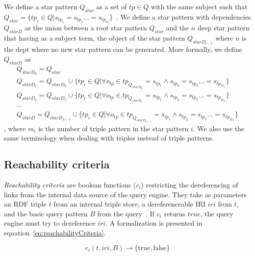 \begin{definition}\label{def:starPattern}
    We define a star pattern $Q_{star}$ as a set of $tp \in Q$ with the same subject such that $Q_{star} = \{ tp_i \in Q| s_{tp_1} = s_{tp_2} ... = s_{tp_m}\}$~\cite{Karim2020}.
    We define a star pattern with dependencies $Q_{starD}$ as the union between a root star pattern $Q_{star}$ and the $n$ deep star pattern
    that having as a subject term, the object of the star pattern $Q_{starD_{i-1}}$ where $n$ is the dept where no new star pattern can be generated.
    More formally, we define $Q_{starD}$ as
    \begin{multline}\label{eq:starPattern1D}
     Q_{starD_0} = Q_{star} \\
     Q_{starD_1} = Q_{starD_0} \cup \{tp_i \in Q| \forall o_{tp} \in tp_{ Q_{starD_0}} = s_{tp_1} \land s_{tp_2} = s_{tp_3} ... = s_{tp_{m_1}}\} \\
     Q_{starD_2} = Q_{starD_1} \cup \{tp_i \in Q| \forall o_{tp} \in tp_{ Q_{starD_1}} = s_{tp_1} \land s_{tp_2} = s_{tp_3} ... = s_{tp_{m_2}}\} \\
     \dotsm \\
     Q_{starD} = Q_{starD_{n-1}} \cup \{tp_i \in Q| \forall o_{tp} \in tp_{ Q_{starD_{n-1}}} = s_{tp_1} \land s_{tp_2} = s_{tp_3} ... = s_{tp_{m_n}}\}
    \end{multline},
    where $m_i$ is the number of triple pattern in the star pattern $i$.
    We also use the same terminology when dealing with triples instead of triple patterns.
\end{definition}

\subsection{Reachability criteria}

\emph{Reachability criteria} are boolean functions ($c_i$) restricting the dereferencing of links from the internal data source of the query engine.
They take as parameters an RDF triple $t$ from an internal triple store, a dereferenceable IRI $iri$ from $t$, and the basic query pattern $B$ from the query~\cite{Hartig2012}.
If $c_i$ returns $true$, the query engine must try to dereference $iri$.
A formalization is presented in equation~\ref{eq:reachabilityCriteria}.


\begin{equation}\label{eq:reachabilityCriteria}
c_i(t, iri, B) \rightarrow \{\mathrm{true}, \mathrm{false}\}
\end{equation}

